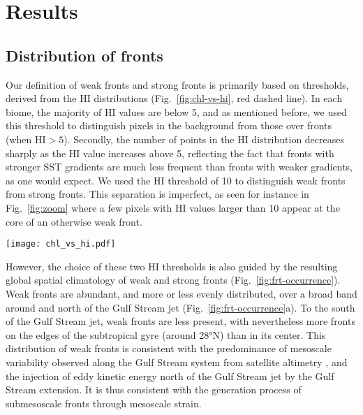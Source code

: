 \section{Results}

\subsection{Distribution of fronts}

Our definition of weak fronts and strong fronts is primarily based on thresholds, derived from the HI distributions (Fig.~\ref{fig:chl-vs-hi}, red dashed line).
In each biome, the majority of HI values are below 5, and as mentioned before, we used this threshold to distinguish pixels in the background from those over fronts (when \(\mathrm{HI} > 5\)).
Secondly, the number of points in the HI distribution decreases sharply as the HI value increases above 5, reflecting the fact that fronts with stronger SST gradients are much less frequent than fronts with weaker gradients, as one would expect.
We used the HI threshold of 10 to distinguish weak fronts from strong fronts.
This separation is imperfect, as seen for instance in Fig.~\ref{fig:zoom} where a few pixels with HI values larger than 10 appear at the core of an otherwise weak front.

\begin{figure*}
  \texttt{[image: chl\_vs\_hi.pdf]}
  \caption{
    Normalized distribution of the Heterogeneity Index (HI, red dashed line) within each biome, and distribution of  as a function of HI (representing front strength), over the full period 2000--2020.
    Shown are the median value of the  distributions (solid black line), and 1st and 3rd quartiles (dashed lines).
    Note that 0.5\% of pixels have outstanding large HI values and are not included here.
  }%
  \label{fig:chl-vs-hi}
\end{figure*}

However, the choice of these two HI thresholds is also guided by the resulting global spatial climatology of weak and strong fronts (Fig.~\ref{fig:frt-occurrence}).
Weak fronts are abundant, and more or less evenly distributed, over a broad band around and north of the Gulf Stream jet (Fig.~\ref{fig:frt-occurrence}a).
To the south of the Gulf Stream jet, weak fronts are less present, with nevertheless more fronts on the edges of the subtropical gyre (around 28°N) than in its center.
This distribution of weak fronts is consistent with the predominance of mesoscale variability observed along the Gulf Stream system from satellite altimetry \citep{zhai_2008}, and the injection of eddy kinetic energy north of the Gulf Stream jet by the Gulf Stream extension.
It is thus consistent with the generation process of submesoscale fronts through mesoscale strain.

